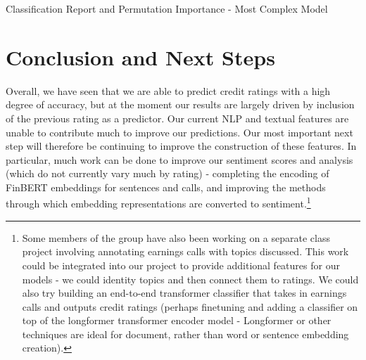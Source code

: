 \documentclass{article}[11pt]
\begin{document}
    \begin{table}[h!]
        \centering
        \caption{Classification Report and Permutation Importance - Most Complex Model}
        \begin{minipage}[c]{0.45\linewidth}
            \centering
            
        \end{minipage}
        \begin{minipage}[c]{0.45\linewidth}
            \centering
            
        \end{minipage}
        \label{tab:most-complex-classification-report-and-permutation-importance}
    \end{table}

    \section*{Conclusion and Next Steps}

    Overall, we have seen that we are able to predict credit ratings with a high degree of accuracy, but at the moment our results are largely driven by inclusion of the previous rating as a predictor. Our current NLP and textual features are unable to contribute much to improve our predictions. Our most important next step will therefore be continuing to improve the construction of these features. In particular, much work can be done to improve our sentiment scores and analysis (which do not currently vary much by rating) - completing the encoding of FinBERT embeddings for sentences and calls, and improving the methods through which embedding representations are converted to sentiment.\footnote{Some members of the group have also been working on a separate class project involving annotating earnings calls with topics discussed. This work could be integrated into our project to provide additional features for our models - we could identity topics and then connect them to ratings. We could also try building an end-to-end transformer classifier that takes in earnings calls and outputs credit ratings (perhaps finetuning and adding a classifier on top of the longformer \citep{beltagy_longformer_2020} transformer encoder model - Longformer or other techniques are ideal for document, rather than word or sentence embedding creation).}
\end{document}
